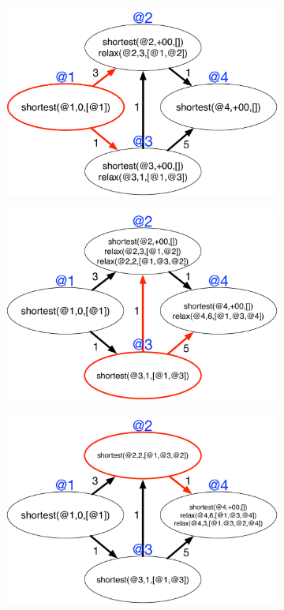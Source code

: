 \begin{figure}
\begin{center}
   \begin{subfigure}[b]{0.4\textwidth}
      \includegraphics[width=\textwidth]{figures/sssp/coord1}
      \caption{}
   \end{subfigure}
   \begin{subfigure}[b]{0.4\textwidth}
      \includegraphics[width=\textwidth]{figures/sssp/coord2}
      \caption{}
   \end{subfigure}
   \begin{subfigure}[b]{0.4\textwidth}
      \includegraphics[width=\textwidth]{figures/sssp/coord3}

\end{subfigure}
\end{center}
\end{figure}
